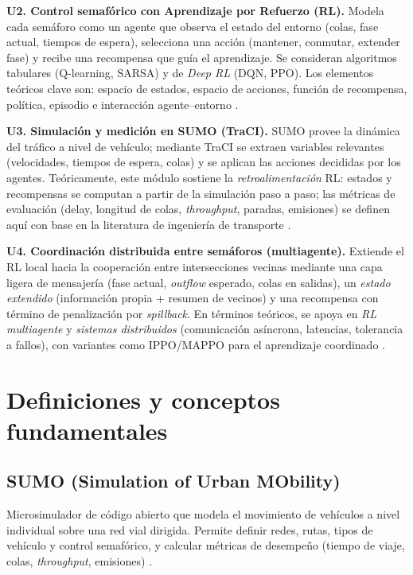 \textbf{U2. Control semafórico con Aprendizaje por Refuerzo (RL).} Modela cada semáforo como un agente que observa el estado del entorno (colas, fase actual, tiempos de espera), selecciona una acción (mantener, conmutar, extender fase) y recibe una recompensa que guía el aprendizaje. Se consideran algoritmos tabulares (Q-learning, SARSA) y de \textit{Deep RL} (DQN, PPO). Los elementos teóricos clave son: espacio de estados, espacio de acciones, función de recompensa, política, episodio e interacción agente–entorno \citep{SuttonBarto2018,Mnih2015_DQN,Schulman2017_PPO}.

\textbf{U3. Simulación y medición en SUMO (TraCI).} SUMO provee la dinámica del tráfico a nivel de vehículo; mediante TraCI se extraen variables relevantes (velocidades, tiempos de espera, colas) y se aplican las acciones decididas por los agentes. Teóricamente, este módulo sostiene la \textit{retroalimentación} RL: estados y recompensas se computan a partir de la simulación paso a paso; las métricas de evaluación (delay, longitud de colas, \textit{throughput}, paradas, emisiones) se definen aquí con base en la literatura de ingeniería de transporte \citep{TraCI_Docs,TraCI_Whitepaper,SUMO_Emissions,FHWA_Timing_Manual_Chapter3,FHWA_Toolbox_Definitions,HCM2000_or_2010}.

\textbf{U4. Coordinación distribuida entre semáforos (multiagente).} Extiende el RL local hacia la cooperación entre intersecciones vecinas mediante una capa ligera de mensajería (fase actual, \textit{outflow} esperado, colas en salidas), un \textit{estado extendido} (información propia + resumen de vecinos) y una recompensa con término de penalización por \textit{spillback}. En términos teóricos, se apoya en \textit{RL multiagente} y \textit{sistemas distribuidos} (comunicación asíncrona, latencias, tolerancia a fallos), con variantes como IPPO/MAPPO para el aprendizaje coordinado \citep{Yu2021_MAPPO}.

\section{Definiciones y conceptos fundamentales}

\subsection*{SUMO (Simulation of Urban MObility)}
Microsimulador de código abierto que modela el movimiento de vehículos a nivel individual sobre una red vial dirigida. Permite definir redes, rutas, tipos de vehículo y control semafórico, y calcular métricas de desempeño (tiempo de viaje, colas, \textit{throughput}, emisiones) \citep{TraCI_Whitepaper,SUMO_Emissions}.

